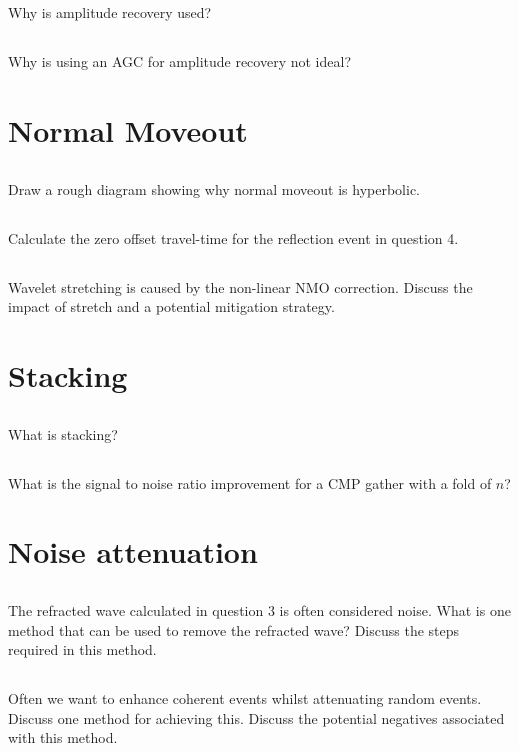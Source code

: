 \subsection{}
Why is amplitude recovery used?
\subsection{}
Why is using an AGC for amplitude recovery not ideal?
\section{Normal Moveout}
\subsection{}
Draw a rough diagram showing why normal moveout is hyperbolic.
\subsection{}
Calculate the zero offset travel-time for the reflection event in question 4.
\subsection{}
Wavelet stretching is caused by the non-linear NMO correction. Discuss the impact of stretch and a potential mitigation strategy.
\section{Stacking}
\subsection{}
What is stacking?  
\subsection{}
What is the signal to noise ratio improvement for a CMP gather with a fold of $n$?
\section{Noise attenuation}
\subsection{}
The refracted wave calculated in question 3 is often considered noise.  What is one method that can be used to remove the refracted wave? Discuss the steps required in this method.
\subsection{}
Often we want to enhance coherent events whilst attenuating random events. Discuss one method for achieving this. Discuss the potential negatives associated with this method.
